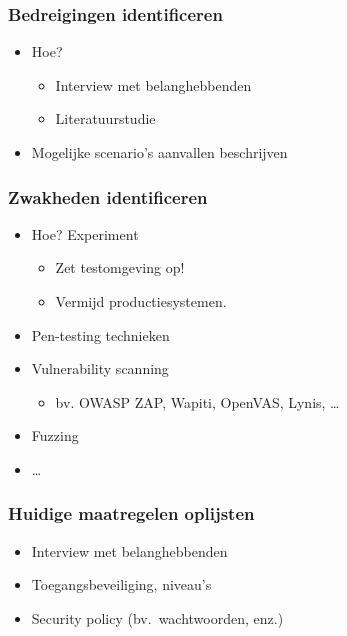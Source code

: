 \documentclass[aspectratio=169]{beamer}
\begin{document}
\begin{frame}
  \frametitle{Bedreigingen identificeren}

  \begin{itemize}
    \item Hoe? 
      \begin{itemize}
        \item Interview met belanghebbenden
        \item Literatuurstudie
      \end{itemize}
    \item Mogelijke scenario's aanvallen beschrijven
  \end{itemize}

\end{frame}

\begin{frame}
  \frametitle{Zwakheden identificeren}

  \begin{itemize}
    \item Hoe? Experiment
    \begin{itemize}
      \item Zet testomgeving op!
      \item Vermijd productiesystemen.
    \end{itemize}
    \item Pen-testing technieken
    \item Vulnerability scanning
      \begin{itemize}
        \item bv. OWASP ZAP, Wapiti, OpenVAS, Lynis, \ldots
      \end{itemize}
    \item Fuzzing
    \item \ldots
  \end{itemize}

\end{frame}

\begin{frame}
  \frametitle{Huidige maatregelen oplijsten}

  \begin{itemize}
    \item Interview met belanghebbenden
    \item Toegangsbeveiliging, niveau's
    \item Security policy (bv.\ wachtwoorden, enz.)
  \end{itemize}

\end{frame}
\end{document}
